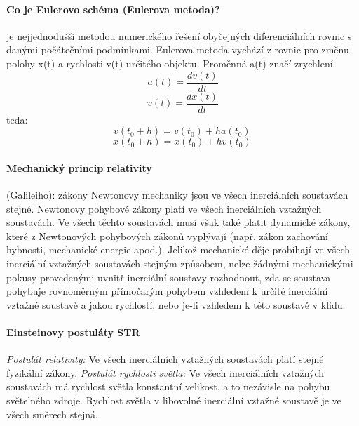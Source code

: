 \documentclass[11pt,a4paper,notitlepage,twocolumn]{article}
\begin{document}
\paragraph{Co je Eulerovo schéma (Eulerova metoda)?}
je nejjednodušší metodou numerického řešení obyčejných 
diferenciálních rovnic s danými počátečními podmínkami.
Eulerova metoda vychází z rovnic pro změnu polohy x(t) a rychlosti v(t) určitého objektu. Proměnná a(t) značí zrychlení.
\[ a(t) = \frac{dv(t)}{dt} \]
\[ v(t) = \frac{dx(t)}{dt} \]
teda:
\[ v(t_0 + h) = v(t_0) + h a(t_0)\, \]
\[ x(t_0 + h) = x(t_0) + h v(t_0)\, \]


\paragraph{Mechanický princip relativity} (Galileiho):
zákony Newtonovy mechaniky jsou ve všech inerciálních soustavách stejné.
Newtonovy pohybové zákony platí ve všech inerciálních vztažných soustavách. 
Ve všech těchto soustavách musí však také platit dynamické zákony, které z 
Newtonových pohybových zákonů vyplývají (např. zákon zachování hybnosti, 
mechanické energie apod.).
Jelikož mechanické děje probíhají ve všech inerciální vztažných soustavách 
stejným způsobem, nelze žádnými mechanickými pokusy provedenými uvnitř 
inerciální soustavy rozhodnout, zda se soustava pohybuje rovnoměrným přímočarým
pohybem vzhledem k určité inerciální vztažné soustavě a jakou rychlostí, 
nebo je-li vzhledem k této soustavě v klidu.

\paragraph{Einsteinovy postuláty STR}
\textit{Postulát relativity:} Ve všech inerciálních vztažných soustavách platí stejné 
fyzikální zákony.
\textit{Postulát rychlosti světla:} Ve všech inerciálních vztažných soustavách 
má rychlost světla konstantní velikost, a to nezávisle na pohybu světelného zdroje. 
Rychlost světla v libovolné inerciální vztažné soustavě je ve všech směrech stejná.
\end{document}
